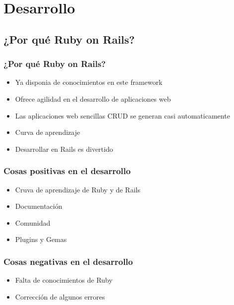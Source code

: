 
\section{Desarrollo} %
	\subsection{¿Por qué Ruby on Rails?}
	\begin{frame}
		\frametitle{¿Por qué Ruby on Rails?}
		\begin{itemize}
			\item <1-| alert@1> Ya disponia de conocimientos en este framework
			\item <2-| alert@2> Ofrece agilidad en el desarrollo de aplicaciones web
			\item <3-| alert@3> Las aplicaciones web sencillas CRUD se generan casi automaticamente
			\item <4-| alert@4> Curva de aprendizaje
			\item <5-| alert@5> Desarrollar en Rails es divertido
		\end{itemize}
	\end{frame}




	\begin{frame}
		\frametitle{Cosas positivas en el desarrollo}
		\begin{itemize}
			\item <1-| alert@1> Cruva de aprendizaje de Ruby y de Rails
			\item <2-| alert@2> Documentación
			\item <3-| alert@3> Comunidad
			\item <4-| alert@4> Plugins y Gemas
		\end{itemize}
	\end{frame}


	\begin{frame}
		\frametitle{Cosas negativas en el desarrollo}
		\setbeamercovered{invisible}
		\begin{itemize}
			\item <1-| alert@1> Falta de conocimientos de Ruby
			\item <2-| alert@2> Corrección de algunos errores
		\end{itemize}
	\end{frame}
